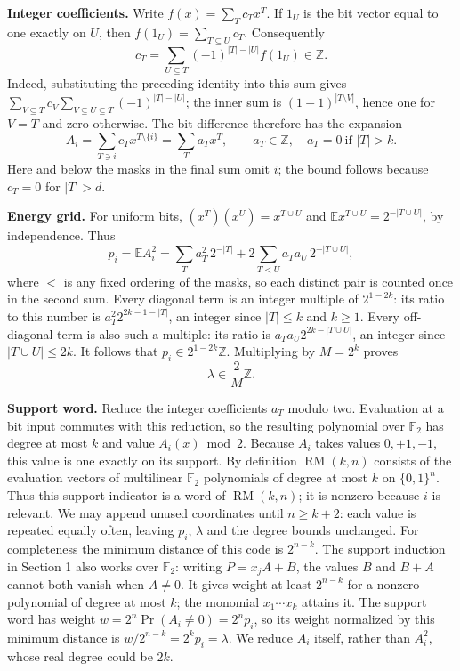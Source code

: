 \documentclass[11pt]{article}
\theoremstyle{remark}
\theoremstyle{correctionstyle}
\begin{document}
\textbf{Integer coefficients.} Write $f(x)=\sum_T c_Tx^T$. If $1_U$ is the
bit vector equal to one exactly on $U$, then $f(1_U)=\sum_{T\subseteq U}c_T$.
Consequently
\[
c_T=\sum_{U\subseteq T}(-1)^{|T|-|U|}f(1_U)\in\mathbb Z.
\]
Indeed, substituting the preceding identity into this sum gives
$\sum_{V\subseteq T}c_V\sum_{V\subseteq U\subseteq T}(-1)^{|T|-|U|}$;
the inner sum is $(1-1)^{|T\setminus V|}$, hence one for $V=T$ and zero otherwise.
The bit difference therefore has the expansion
\[
A_i=\sum_{T\ni i}c_Tx^{T\setminus\{i\}}=\sum_T a_Tx^T,
\qquad a_T\in\mathbb Z,\quad a_T=0\ \text{if }|T|>k.
\]
Here and below the masks in the final sum omit $i$; the bound follows
because $c_T=0$ for $|T|>d$.

\label{src-p046}\label{src-end-p046}\label{src-p047}\label{src-end-p047}%
\textbf{Energy grid.} For uniform bits, $(x^T)(x^U)=x^{T\cup U}$ and
$\mathbb E x^{T\cup U}=2^{-|T\cup U|}$, by independence. Thus
\[
p_i=\mathbb E A_i^2
=\sum_T a_T^2\,2^{-|T|}
 +2\sum_{T<U}a_Ta_U\,2^{-|T\cup U|},
\]
where $<$ is any fixed ordering of the masks, so each distinct pair is
counted once in the second sum. Every diagonal term is an integer multiple
of $2^{1-2k}$: its ratio to this number is
$a_T^2 2^{2k-1-|T|}$, an integer since $|T|\le k$ and $k\ge1$.
Every off-diagonal term is also such a multiple: its ratio is
$a_Ta_U2^{2k-|T\cup U|}$, an integer since $|T\cup U|\le2k$.
It follows that $p_i\in2^{1-2k}\mathbb Z$. Multiplying by $M=2^k$ proves
\begin{equation}
\lambda\in\frac2M\mathbb Z.\tag{6}
\label{src-p048}
\end{equation}
\label{src-end-p048}%

\label{src-p049}\label{src-end-p049}%
\textbf{Support word.} Reduce the integer coefficients $a_T$ modulo two.
Evaluation at a bit input commutes with this reduction, so the resulting
polynomial over $\mathbb F_2$ has degree at most $k$ and value
$A_i(x)\bmod2$. Because $A_i$ takes values $0,+1,-1$, this value is one
exactly on its support. By definition $\operatorname{RM}(k,n)$ consists of the evaluation vectors
of multilinear $\mathbb F_2$ polynomials of degree at most $k$ on $\{0,1\}^n$.
Thus this support indicator is a word of $\operatorname{RM}(k,n)$; it is
nonzero because $i$ is relevant. We may append unused
coordinates until $n\ge k+2$: each value is repeated equally often, leaving
$p_i$, $\lambda$ and the degree bounds unchanged.
For completeness the minimum distance of this code is $2^{n-k}$.
The support induction in Section 1 also works over $\mathbb F_2$: writing
$P=x_jA+B$, the values $B$ and $B+A$ cannot both vanish when $A\ne0$.
It gives weight at least $2^{n-k}$ for a nonzero polynomial of degree at
most $k$; the monomial $x_1\cdots x_k$ attains it.
The support word has weight $w=2^n\Pr(A_i\ne0)=2^np_i$, so its weight
normalized by this minimum distance is $w/2^{n-k}=2^kp_i=\lambda$.
We reduce $A_i$ itself, rather than $A_i^2$, whose real degree could be $2k$.
\end{document}
